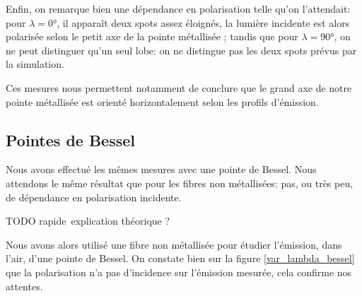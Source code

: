 Enfin, on remarque bien une dépendance en polarisation telle qu'on l'attendait: pour $\lambda = 0\si{\degree}$, il apparaît deux spots assez éloignés, la lumière incidente est alors polarisée selon le petit axe de la pointe métallisée ; tandis que pour  $\lambda = 90\si{\degree}$, on ne peut distinguer qu'un seul lobe: on ne distingue pas les deux spots prévus par la simulation.

Ces mesures nous permettent notamment de conclure que le grand axe de notre pointe métallisée est orienté horizontalement selon les profils d'émission.





\subsection{Pointes de Bessel}
Nous avons effectué les mêmes mesures avec une pointe de Bessel. Nous attendons le même résultat que pour les fibres non métallisées: pas, ou très peu, de dépendance en polarisation incidente.

TODO rapide explication théorique ?

Nous avons alors utilisé une fibre non métallisée pour étudier l'émission, dans l'air, d'une pointe de Bessel. On constate bien sur la figure \ref{var_lambda_bessel} que la polarisation n'a pas d'incidence sur l'émission mesurée, cela confirme nos attentes.

